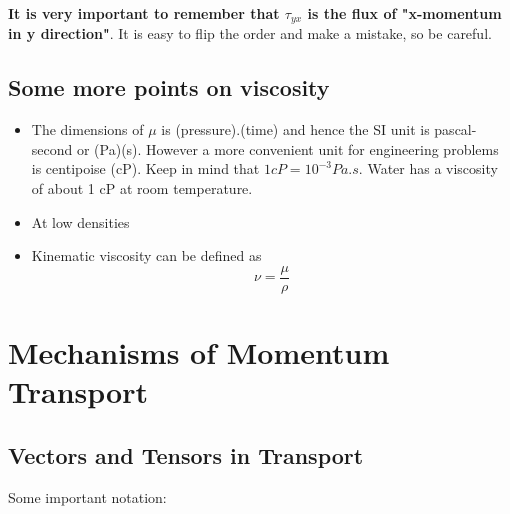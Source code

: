 \textbf{It is very important to remember that $\tau_{yx}$ is the flux of "x-momentum in y direction"}. It is easy to flip the order and make a mistake, so be careful.

\subsection*{Some more points on viscosity}

\begin{itemize}
    \item The dimensions of $\mu$ is (pressure).(time) and hence the SI unit is pascal-second or (Pa)(s). However a more convenient unit for engineering problems is centipoise (cP). Keep in mind that $1 cP = 10^{-3} Pa.s$. Water has a viscosity of about 1 cP at room temperature.

    \item At low densities 

    \item Kinematic viscosity can be defined as $$\nu = \frac{\mu}{\rho}$$
\end{itemize}

\section{Mechanisms of Momentum Transport}

\subsection{Vectors and Tensors in Transport}

Some important notation:


